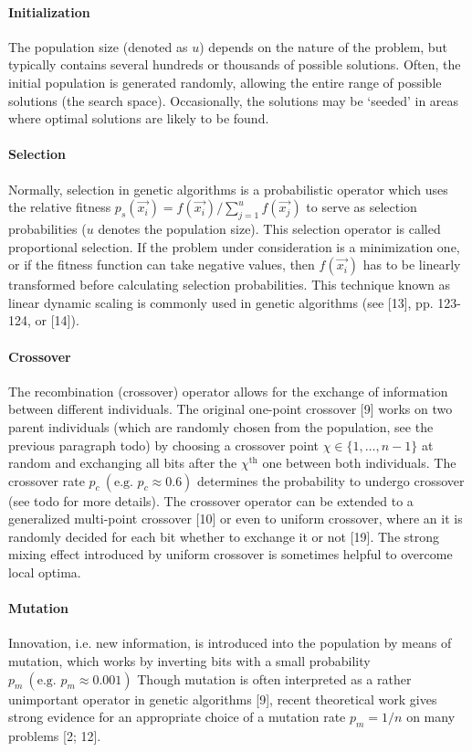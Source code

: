 \documentclass[12pt]{article}
\begin{document}
\paragraph{Initialization}
The population size (denoted as $u$) depends on the nature of the problem,
but typically contains several hundreds or thousands of possible solutions.
Often, the initial population is generated randomly, allowing the entire range
of possible solutions (the search space).
Occasionally, the solutions may be `seeded' in areas where optimal solutions
are likely to be found.

\paragraph{Selection}
Normally, selection in genetic algorithms is a probabilistic operator
which uses the relative fitness 
$ p_s \left( \vec{x_i} \right) = 
f \left( \vec{x_i} \right) / \sum_{j=1}^uf \left( \vec{x_j} \right) $
to serve as selection probabilities
($u$ denotes the population size). This selection operator
is called proportional selection. If the problem under
consideration is a minimization one, or if the fitness
function can take negative values, then $ f \left( \vec{x_i} \right) $ has to be
linearly transformed before calculating selection probabilities.
This technique known as linear dynamic scaling is commonly used
in genetic algorithms (see [13], pp. 123-124, or [14]).

\paragraph{Crossover}
The recombination (crossover) operator allows for the
exchange of information between different individuals. The
original one-point crossover [9] works on two parent individuals
(which are randomly chosen from the population, see the previous paragraph todo)
by choosing a crossover point $ \chi \in \{1, \dots, n-1 \} $
at random and exchanging all bits after the $ \chi^{\text{th}} $ one
between both individuals. The crossover rate
$ p_c \ (\text{e.g. } p_c \approx 0.6) $
determines the probability to undergo crossover (see todo for more details).
The crossover operator can be extended to a generalized
multi-point crossover [10] or even to uniform crossover,
where an it is randomly decided for each bit
whether to exchange it or not [19]. The strong mixing effect
introduced by uniform crossover is sometimes helpful
to overcome local optima.

\paragraph{Mutation}
Innovation, i.e. new information, is introduced into the
population by means of mutation, which works by inverting
bits with a small probability
$ p_m \ (\text{e.g. } p_m \approx 0.001) $
Though mutation is often interpreted as a rather unimportant operator
in genetic algorithms [9], recent theoretical
work gives strong evidence for an appropriate choice of a
mutation rate $ p_m = 1/n $ on many problems [2; 12].
\end{document}
